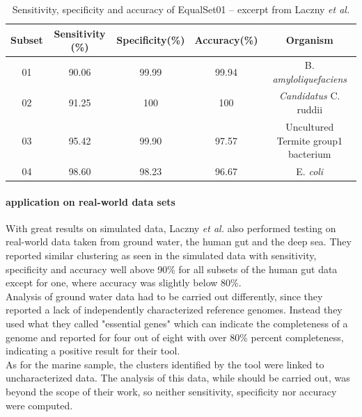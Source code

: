 \documentclass[twocolumn]{bmcart}%
\begin{document}
\begin{table}[h]
	\centering
	\caption{Sensitivity, specificity and accuracy of EqualSet01 -- excerpt from Laczny \textit{et al.}\cite{Laczny2014}}
	\begin{tabular}{c|c|c|c|c}
		Subset&Sensitivity (\%)&Specificity(\%)&Accuracy(\%)&Organism\\
		\hline
		01&90.06&99.99&99.94&B. \textit{amyloliquefaciens}\\
		02&91.25&100&100&\textit{Candidatus} C. ruddii\\
		03&95.42&99.90&97.57&Uncultured Termite group1 bacterium\\
		04&98.60&98.23&96.67&E. \textit{coli}
	\end{tabular}
\label{tab:sens-spec-acc1}
\end{table}
\paragraph*{application on real-world data sets}
With great results on simulated data, Laczny \textit{et al.} also performed testing on real-world data taken from ground water\cite{Wrighton1661}, the human gut \cite{Arumugam2011} and the deep sea\cite{Konstantinidis15082009}. They reported similar clustering as seen in the simulated data with sensitivity, specificity and accuracy well above 90\% for all subsets of the human gut data except for one, where accuracy was slightly below 80\%.\\
Analysis of ground water data had to be carried out differently, since they reported a lack of independently characterized reference genomes. Instead they used what they called "essential genes" which can indicate the completeness of a genome and reported for four out of eight with over 80\% percent completeness, indicating a positive result for their tool.\\ 
As for the marine sample, the clusters identified by the tool were linked to uncharacterized data. The analysis of this data, while should be carried out, was beyond the scope of their work, so neither sensitivity, specificity nor accuracy were computed.\\
\end{document}
